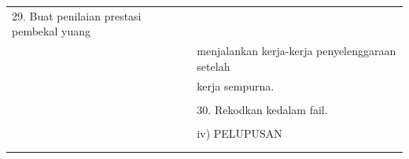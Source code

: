\documentclass[
]{article}
\begin{document}
\begin{longtable}[]{@{}ll@{}}
\begin{minipage}[t]{0.71\columnwidth}
29. Buat penilaian prestasi pembekal yuang\strut
\end{minipage}\tabularnewline
\begin{minipage}[t]{0.23\columnwidth}\raggedright
\strut
\end{minipage} & \begin{minipage}[t]{0.71\columnwidth}\raggedright
menjalankan kerja-kerja penyelenggaraan setelah\strut
\end{minipage}\tabularnewline
\begin{minipage}[t]{0.23\columnwidth}\raggedright
\strut
\end{minipage} & \begin{minipage}[t]{0.71\columnwidth}\raggedright
kerja sempurna.\strut
\end{minipage}\tabularnewline
\begin{minipage}[t]{0.23\columnwidth}\raggedright
\strut
\end{minipage} & \begin{minipage}[t]{0.71\columnwidth}\raggedright
\strut
\end{minipage}\tabularnewline
\begin{minipage}[t]{0.23\columnwidth}\raggedright
\strut
\end{minipage} & \begin{minipage}[t]{0.71\columnwidth}\raggedright
30. Rekodkan kedalam fail.\strut
\end{minipage}\tabularnewline
\begin{minipage}[t]{0.23\columnwidth}\raggedright
\strut
\end{minipage} & \begin{minipage}[t]{0.71\columnwidth}\raggedright
\strut
\end{minipage}\tabularnewline
\begin{minipage}[t]{0.23\columnwidth}\raggedright
\strut
\end{minipage} & \begin{minipage}[t]{0.71\columnwidth}\raggedright
iv) PELUPUSAN\strut
\end{minipage}\tabularnewline
\begin{minipage}[t]{0.23\columnwidth}\raggedright
\strut
\end{minipage} & \begin{minipage}[t]{0.71\columnwidth}\raggedright
\strut
\end{minipage}\tabularnewline
\begin{minipage}[t]{0.23\columnwidth}\raggedright
\strut
\end{minipage} & \begin{minipage}[t]{0.71\columnwidth}\raggedright

\end{minipage}
\end{longtable}
\end{document}
